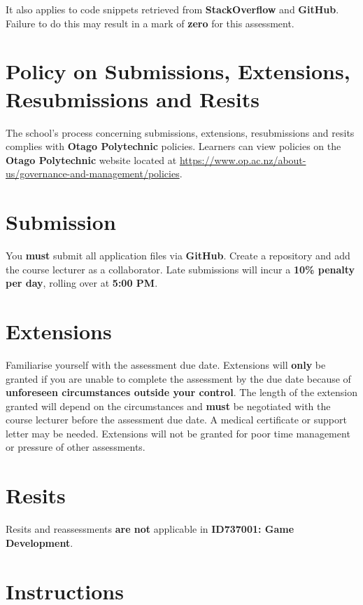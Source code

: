 \documentclass{article}
\begin{document}
It also applies to code snippets retrieved from \textbf{StackOverflow} and \textbf{GitHub}. \\
 
Failure to do this may result in a mark of \textbf{zero} for this assessment.

\section*{Policy on Submissions, Extensions, Resubmissions and Resits}
The school's process concerning submissions, extensions, resubmissions and resits complies with \textbf{Otago Polytechnic} policies. Learners can view policies on the \textbf{Otago Polytechnic} website located at \href{https://www.op.ac.nz/about-us/governance-and-management/policies}{https://www.op.ac.nz/about-us/governance-and-management/policies}.

\section*{Submission}
You \textbf{must} submit all application files via \textbf{GitHub}. Create a repository and add the course lecturer as a collaborator. Late submissions will incur a \textbf{10\% penalty per day}, rolling over at \textbf{5:00 PM}.

\section*{Extensions}
Familiarise yourself with the assessment due date. Extensions will \textbf{only} be granted if you are unable to complete the assessment by the due date because of \textbf{unforeseen circumstances outside your control}. The length of the extension granted will depend on the circumstances and \textbf{must} be negotiated with the course lecturer before the assessment due date. A medical certificate or support letter may be needed. Extensions will not be granted for poor time management or pressure of other assessments.

\section*{Resits}
Resits and reassessments \textbf{are not} applicable in \textbf{ID737001: Game Development}.

\section*{Instructions}
\end{document}
